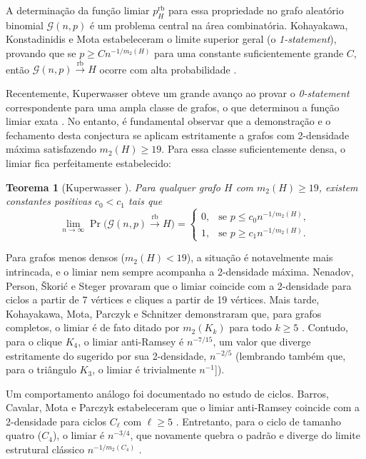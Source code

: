 \documentclass[reqno, 12pt]{amsart}
\numberwithin{equation}{section}
\theoremstyle{definition}
\theoremstyle{plain}
\newtheorem{theorem}[definition]{Teorema}
\begin{document}
A determinação da função limiar $p_{H}^{\text{rb}}$ para essa propriedade no grafo aleatório binomial $\mathcal{G}(n,p)$ é um problema central na área combinatória. Kohayakawa, Konstadinidis e Mota estabeleceram o limite superior geral (o \emph{1-statement}), provando que se $p \ge C n^{-1/m_2(H)}$ para uma constante suficientemente grande $C$, então $\mathcal{G}(n,p) \xrightarrow{\text{rb}} H$ ocorre com alta probabilidade \cite{kohayakawa2014anti}. 

Recentemente, Kuperwasser obteve um grande avanço ao provar o \emph{0-statement} correspondente para uma ampla classe de grafos, o que determinou a função limiar exata \cite{kuperwasser2026anti}. No entanto, é fundamental observar que a demonstração e o fechamento desta conjectura se aplicam estritamente a grafos com 2-densidade máxima satisfazendo $m_2(H) \ge 19$. Para essa classe suficientemente densa, o limiar fica perfeitamente estabelecido:

\begin{theorem}[Kuperwasser \cite{kuperwasser2026anti}]
Para qualquer grafo $H$ com $m_2(H) \ge 19$, existem constantes positivas $c_0 < c_1$ tais que
\[
\lim_{n\to\infty}\Pr\big(\mathcal{G}(n,p) \xrightarrow{\text{rb}} H\big)
=
\begin{cases}
0, & \text{se } p \le c_0 n^{-1/m_2(H)},\\[4pt]
1, & \text{se } p \ge c_1 n^{-1/m_2(H)}.
\end{cases}
\]

\end{theorem}

Para grafos menos densos ($m_2(H) < 19$), a situação é notavelmente mais intrincada, e o limiar nem sempre acompanha a 2-densidade máxima. Nenadov, Person, Škorić e Steger \cite{nenadov2017algorithmic} provaram que o limiar coincide com a 2-densidade para ciclos a partir de 7 vértices e cliques a partir de 19 vértices. Mais tarde, Kohayakawa, Mota, Parczyk e Schnitzer demonstraram que, para grafos completos, o limiar é de fato ditado por $m_2(K_k)$ para todo $k \ge 5$ \cite{AntiComplete}. Contudo, para o clique $K_4$, o limiar anti-Ramsey é $n^{-7/15}$, um valor que diverge estritamente do sugerido por sua 2-densidade, $n^{-2/5}$ \cite{AntiComplete} (lembrando também que, para o triângulo $K_3$, o limiar é trivialmente $n^{-1}$]).

Um comportamento análogo foi documentado no estudo de ciclos. Barros, Cavalar, Mota e Parczyk estabeleceram que o limiar anti-Ramsey coincide com a 2-densidade para ciclos $C_\ell$ com $\ell \ge 5$ \cite{AntiCycles}. Entretanto, para o ciclo de tamanho quatro ($C_4$), o limiar é $n^{-3/4}$, que novamente quebra o padrão e diverge do limite estrutural clássico $n^{-1/m_2(C_4)}$ \cite{AntiCycles}.
\end{document}
